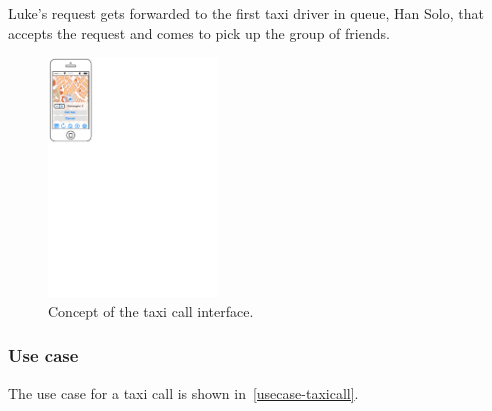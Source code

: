 Luke's request gets forwarded to the first taxi driver in queue, Han Solo, that accepts the request and comes to pick up the group of friends.


\begin{figure}
\begin{center}
\includegraphics[width=0.4\textwidth]{mockup/TaxiCall.pdf}
\caption{Concept of the taxi call interface.}
\label{fig:mockup-taxicall}
\end{center}
\end{figure}

\subsubsection{Use case}
The use case for a taxi call is shown in~\autoref{usecase-taxicall}.

